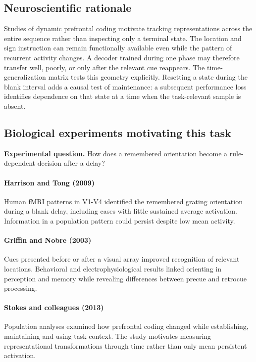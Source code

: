 \documentclass[11pt]{article}
\begin{document}
\subsection{Neuroscientific rationale}
Studies of dynamic prefrontal coding motivate tracking representations across the entire sequence rather than inspecting only a terminal state. The location and sign instruction can remain functionally available even while the pattern of recurrent activity changes. A decoder trained during one phase may therefore transfer well, poorly, or only after the relevant cue reappears. The time-generalization matrix tests this geometry explicitly. Resetting a state during the blank interval adds a causal test of maintenance: a subsequent performance loss identifies dependence on that state at a time when the task-relevant sample is absent.

\subsection{Biological experiments motivating this task}
\textbf{Experimental question.} How does a remembered orientation become a rule-dependent decision after a delay?

\paragraph{Harrison and Tong (2009)} Human fMRI patterns in V1-V4 identified the remembered grating orientation during a blank delay, including cases with little sustained average activation. Information in a population pattern could persist despite low mean activity. \cite{bio_harrison}

\paragraph{Griffin and Nobre (2003)} Cues presented before or after a visual array improved recognition of relevant locations. Behavioral and electrophysiological results linked orienting in perception and memory while revealing differences between precue and retrocue processing. \cite{bio_griffin}

\paragraph{Stokes and colleagues (2013)} Population analyses examined how prefrontal coding changed while establishing, maintaining and using task context. The study motivates measuring representational transformations through time rather than only mean persistent activation. \cite{bio_stokes}
\end{document}
